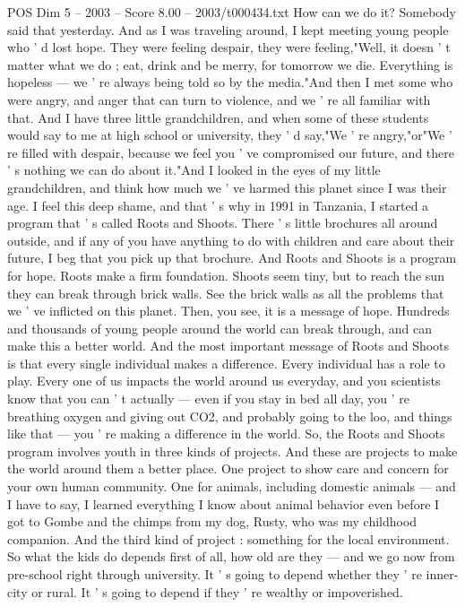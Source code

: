 \begin{textsample}{POS Dim 5 – 2003 – Score 8.00 – 2003/t000434.txt}
How can we do it?
Somebody said that yesterday.
And as I was traveling around, I kept meeting young people who ' d lost hope.
They were feeling despair, they were feeling,"Well, it doesn ' t matter what we do ; eat, drink and be merry, for tomorrow we die.
Everything is hopeless — we ' re always being told so by the media."And then I met some who were angry, and anger that can turn to violence, and we ' re all familiar with that.
And I have three little grandchildren, and when some of these students would say to me at high school or university, they ' d say,"We ' re angry,"or"We ' re filled with despair, because we feel you ' ve compromised our future, and there ' s nothing we can do about it."And I looked in the eyes of my little grandchildren, and think how much we ' ve harmed this planet since I was their age.
I feel this deep shame, and that ' s why in 1991 in Tanzania, I started a program that ' s called Roots and Shoots.
There ' s little brochures all around outside, and if any of you have anything to do with children and care about their future, I beg that you pick up that brochure.
And Roots and Shoots is a program for hope.
Roots make a firm foundation.
Shoots seem tiny, but to reach the sun they can break through brick walls.
See the brick walls as all the problems that we ' ve inflicted on this planet.
Then, you see, it is a message of hope.
Hundreds and thousands of young people around the world can break through, and can make this a better world.
And the most important message of Roots and Shoots is that every single individual makes a difference.
Every individual has a role to play.
Every one of us impacts the world around us everyday, and you scientists know that you can ' t actually — even if you stay in bed all day, you ' re breathing oxygen and giving out CO2, and probably going to the loo, and things like that — you ' re making a difference in the world.
So, the Roots and Shoots program involves youth in three kinds of projects.
And these are projects to make the world around them a better place.
One project to show care and concern for your own human community.
One for animals, including domestic animals — and I have to say, I learned everything I know about animal behavior even before I got to Gombe and the chimps from my dog, Rusty, who was my childhood companion.
And the third kind of project : something for the local environment.
So what the kids do depends first of all, how old are they — and we go now from pre-school right through university.
It ' s going to depend whether they ' re inner-city or rural.
It ' s going to depend if they ' re wealthy or impoverished.

\end{textsample}
